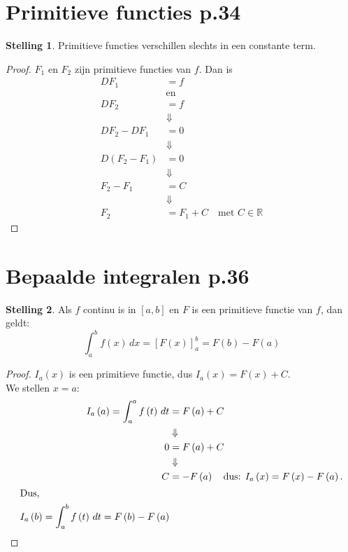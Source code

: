 \documentclass{article}
\theoremstyle{definition}
\newtheorem*{Stelling}{Stelling}
\begin{document}
\section{Primitieve functies p.34}
\begin{Stelling}
  Primitieve functies verschillen slechts in een constante term.
\end{Stelling}
\begin{proof}
  $F_1$ en $F_2$ zijn primitieve functies van $f$. Dan is
  \begin{align*}
    DF_1 &= f\\
         &\text{en}\\
    DF_2&=f\\
         &\Downarrow\\
    DF_2-DF_1 &= 0\\
              &\Downarrow\\
    D\left(F_2-F_1\right)&=0\\
                        &\Downarrow\\
      F_2-F_1&=C\\
             &\Downarrow\\
      F_2&=F_1+C \quad \text{met } C\in\mathbb{R}    
  \end{align*}
\end{proof}
\section{Bepaalde integralen p.36}
\begin{Stelling}
 Als $f$ continu is in $\left[a,b\right]$ en $F$ is een primitieve functie van $f$, dan geldt:
 $$\displaystyle\int_{a}^{b}f\left(x\right)\,dx = \left[F\left(x\right)\right]_a^b = F\left(b\right) - F\left(a\right) $$
\end{Stelling}
\begin{proof}
  $I_a\left(x\right)$ is een primitieve functie, dus $I_a\left(x\right) = F\left(x\right) + C.$\\
  We stellen $x=a$:
  \begin{align*}
    I_a\left(a\right)=\displaystyle\int_{a}^{a}f\left(t\right)\,dt &= F\left(a\right)+C\\
                                             &\Downarrow\\
    0&=F\left(a\right)+C\\
                                             &\Downarrow\\
    C &= -F\left(a\right) \quad \text{dus: } I_a\left(x\right) = F\left(x\right)-F\left(a\right).\\
    \intertext{Dus, }
    I_a\left(b\right) = \displaystyle\int_{a}^{b}f\left(t\right)\,dt = F\left(b\right)-F\left(a\right)
  \end{align*}
\end{proof}
\end{document}
